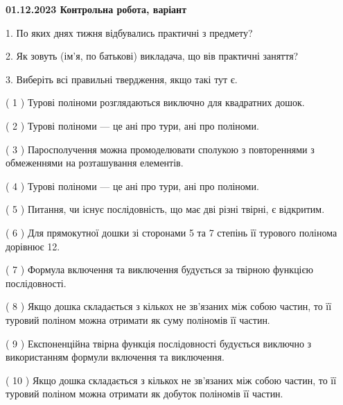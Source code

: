 \documentclass[12pt, ukrainian]{article}
\begin{document}
\vspace{4mm}
\newpage
\begin {large}

\textbf{01.12.2023 Контрольна робота, варіант  }\par


{
1. По яких днях тижня відбувались практичні з предмету?



\vspace{5mm}
2. Як зовуть (ім'я, по батькові) викладача, що вів практичні заняття?



\vspace{5mm}
3. Виберіть всі правильні твердження, якщо такі тут є.\par
\vspace{2mm}
( 1 ) Турові поліноми розглядаються виключно для квадратних дошок.%

( 2 ) Турові поліноми --- це ані про тури, ані про поліноми.%

( 3 ) Паросполучення можна промоделювати сполукою з повтореннями з обмеженнями на розташування елементів.%

( 4 ) Турові поліноми --- це ані про тури, ані про поліноми.%

( 5 ) Питання, чи існує послідовність, що має дві різні твірні, є відкритим.%

( 6 ) Для прямокутної дошки зі сторонами 5 та 7 степінь її турового полінома дорівнює 12.%

( 7 ) Формула включення та виключення будується за твірною функцією послідовності.%

( 8 ) Якщо дошка складається з кількох не зв’язаних між собою частин, то її туровий поліном можна отримати як суму поліномів її частин.%

( 9 ) Експоненційна твірна функція послідовності будується виключно з використанням формули включення та виключення.%

( 10 ) Якщо дошка складається з кількох не зв’язаних між собою частин, то її туровий поліном можна отримати як добуток поліномів її частин.%
}
\end {large}
\end{document}
